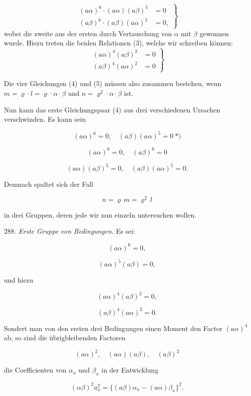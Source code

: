 \documentclass[11pt]{article}
\providecommand{\weberpage}[1]{}
\providecommand{\weq}[2]{\begin{equation}\tag{#1}#2\end{equation}}
\begin{document}
\weq{4}{
\left.\begin{aligned}
(a\alpha)^6\cdot(a\alpha)(a\beta)^5&=0\\
(a\beta)^6\cdot(a\beta)(a\alpha)^5&=0,
\end{aligned}\right\}
}
wobei die zweite aus der ersten durch Vertauschung von $\alpha$ mit $\beta$ gewonnen wurde. Hiezu treten die beiden Relationen (3), welche wir schreiben können:
\weq{5}{
\left.\begin{aligned}
(a\alpha)^4(a\beta)^2&=0\\
(a\beta)^4(a\alpha)^2&=0
\end{aligned}\right\}
}


\weberpage{313}

Die vier Gleichungen (4) und (5) müssen also zusammen bestehen, wenn $m = \varrho \cdot l = \varrho \cdot \alpha \cdot \beta$ und $n = \varrho^2 \cdot \alpha \cdot \beta$ ist.

Nun kann das erste Gleichungspaar (4) aus drei verschiedenen Ursachen verschwinden. Es kann sein

\weq{1}{(a\alpha)^6=0,\quad (a\beta)(a\alpha)^5=0\ *)}

\weq{2}{(a\alpha)^6=0,\quad (a\beta)^6=0}

\weq{3}{(a\alpha)(a\beta)^5=0,\quad (a\beta)(a\alpha)^5=0.}

Demnach spaltet sich der Fall

\[ n = \varrho\, m = \varrho^2\, l \]

in drei Gruppen, deren jede wir nun einzeln untersuchen wollen.

288. \textit{Erste Gruppe von Bedingungen.} Es sei:

\weq{1}{(a\alpha)^6=0,}

\weq{2}{(a\alpha)^5(a\beta)=0,}

und hiezu

\weq{3}{(a\alpha)^4(a\beta)^2=0,}

\weq{4}{(a\beta)^4(a\alpha)^2=0.}

Sondert man von den ersten drei Bedingungen einen Moment den Factor $(a\alpha)^4$ ab, so sind die übrigbleibenden Factoren

\[ (a\alpha)^2,\quad (a\alpha)(a\beta),\quad (a\beta)^2 \]

die Coefficienten von $\alpha_x$ und $\beta_x$ in der Entwicklung

\[ (\alpha\beta)^2 a_x^2 = \{(a\beta)\alpha_x - (a\alpha)\beta_x\}^2. \]
\end{document}
